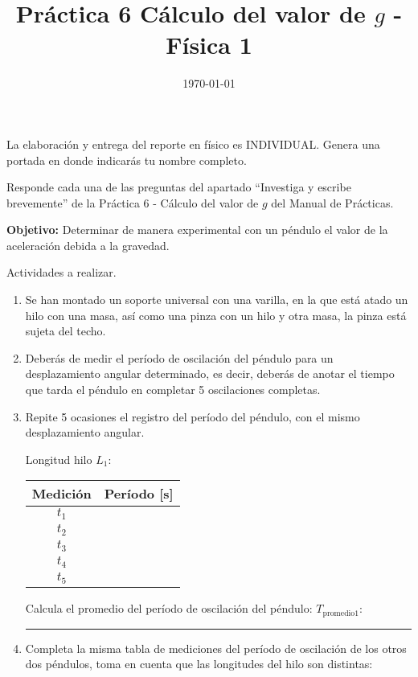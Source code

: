 \documentclass[14pt]{extarticle}
\title{\vspace*{-2cm} Práctica 6 Cálculo del valor de $g$ - Física 1\vspace{-5ex}}
\date{\today}
\begin{document}
\maketitle

La elaboración y entrega del reporte en físico es INDIVIDUAL. Genera una portada en donde indicarás tu nombre completo.

Responde cada una de las preguntas del apartado \enquote{Investiga y escribe brevemente} de la Práctica 6 - Cálculo del valor de $g$ del Manual de Prácticas.

\textbf{Objetivo: } Determinar de manera experimental con un péndulo el valor de la aceleración debida a la gravedad. 

Actividades a realizar.
\begin{enumerate}
\item Se han montado un soporte universal con una varilla, en la que está atado un hilo con una masa, así como una pinza con un hilo y otra masa, la pinza está sujeta del techo.
\item Deberás de medir el período de oscilación del péndulo para un desplazamiento angular determinado, es decir, deberás de anotar el tiempo que tarda el péndulo en completar 5 oscilaciones completas.
\item Repite 5 ocasiones el registro del período del péndulo, con el mismo desplazamiento angular.

Longitud hilo $L_{1}$: 
\begin{table}[H]
\centering
\begin{tabular}{| c | c |} \hline
Medición & Período [\unit{\second}] \\ \hline
$t_{1}$ &  \\ \hline
$t_{2}$ &  \\ \hline
$t_{3}$ &  \\ \hline
$t_{4}$ &  \\ \hline
$t_{5}$ &  \\ \hline    
\end{tabular}
\end{table}
Calcula el promedio del período de oscilación del péndulo: $T_{\text{promedio1}}$: \rule{2cm}{0.3mm}
\item Completa la misma tabla de mediciones del período de oscilación de los otros dos péndulos, toma en cuenta que las longitudes del hilo son distintas:


\end{enumerate}
\end{document}
